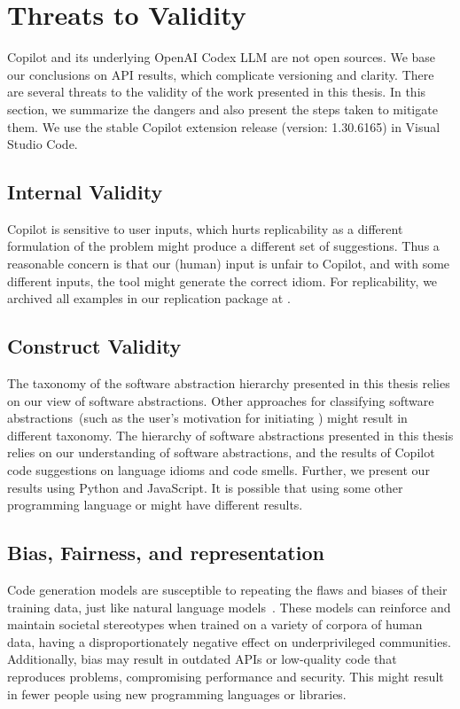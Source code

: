 \section{Threats to Validity}
\label{limitations}
Copilot and its underlying OpenAI Codex LLM are not open sources. 
We base our conclusions on API results, which complicate versioning and clarity. There are several threats to the validity of the work presented in this thesis. In this section, we summarize the dangers and also present the steps taken to mitigate them. We use the stable Copilot extension release (version: 1.30.6165) in Visual Studio Code. %

\subsection{Internal Validity}
Copilot is sensitive to user inputs, which hurts replicability as a different formulation of the problem might produce a different set of suggestions. 
Thus a reasonable concern is that our (human) input is unfair to Copilot, and with some different inputs, the tool might generate the correct idiom. 
For replicability, we archived all examples in our replication package at \repl{}.

\subsection{Construct Validity}
The taxonomy of the software abstraction hierarchy presented in this thesis relies on our view of software abstractions.
Other approaches for classifying software abstractions~(such as the user's motivation for initiating \cct{}) might result in different taxonomy.
The hierarchy of software abstractions presented in this thesis relies on our understanding of software abstractions, and the results of Copilot code suggestions on language idioms and code smells. Further, we present our results using Python and JavaScript. It is possible that using some other programming language or \cct{} might have different results.

\subsection{Bias, Fairness, and representation}
Code generation models are susceptible to repeating the flaws and biases of their training data, just like natural language models~\cite{Gpt3}. These models can reinforce and maintain societal stereotypes when trained on a variety of corpora of human data, having a disproportionately negative effect on underprivileged communities. 
Additionally, bias may result in outdated APIs or low-quality code that reproduces problems, compromising performance and security. This might result in fewer people using new programming languages or libraries.


